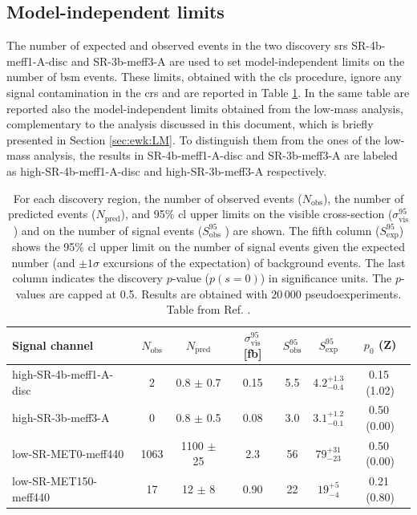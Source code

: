 \subsection{Model-independent limits}
\label{sec:ewk:modelindepUL}

The number of expected and observed events in the two discovery \glspl{sr} SR-4b-meff1-A-disc and SR-3b-meff3-A are used to set model-independent limits on the number of \gls{bsm} events. 
These limits, obtained with the \gls{cls} procedure, ignore any signal contamination in the \glspl{cr} and are reported in Table \ref{tab:ewk:UL_toys}.
In the same table are reported also the model-independent limits obtained from the low-mass analysis, complementary to the analysis 
discussed in this document, which is briefly presented in Section \ref{sec:ewk:LM}. 
To distinguish them from the ones of the low-mass analysis, the results in SR-4b-meff1-A-disc and SR-3b-meff3-A are labeled as 
high-SR-4b-meff1-A-disc and high-SR-3b-meff3-A respectively. 

\begin{table}[htbp]
\begin{center}
\begin{tabular}{|l|c|c|c|c|c|c|}
\toprule
{ Signal channel}           &   $N_\mathrm{obs}$ & $N_\mathrm{pred}$       & $\sigma^\mathrm{95}_\mathrm{vis}$ [fb] &  $S_\mathrm{obs}^\mathrm{95}$  & $S_\mathrm{exp}^\mathrm{95}$ & $p_0$ (Z)  \\
\midrule
high-SR-4b-meff1-A-disc   &    2 &     0.8 $\pm$ 0.7  & 0.15 &   5.5 & ${ 4.2 }^{ +1.3 }_{ -0.4 }$  &  0.15$~$(1.02) \\%
high-SR-3b-meff3-A        &    0 &     0.8 $\pm$ 0.5  & 0.08 &   3.0 & ${ 3.1 }^{ +1.2 }_{ -0.1 }$  &  0.50$~$(0.00) \\%
low-SR-MET0-meff440       & 1063 &    1100 $\pm$ 25   & 2.3  &  56   & ${ 79 }^{ +31 }_{ -23 }$     &  0.50$~$(0.00) \\%
low-SR-MET150-meff440     &   17 &      12 $\pm$ 8    & 0.90 &  22   & ${ 19 }^{ +5 }_{ -4 }$       &  0.21$~$(0.80) \\%
\bottomrule
\end{tabular}
\end{center}
\caption[Model independent upper limits]{For each discovery region, the number of observed events ($N_\mathrm{obs}$), the number of predicted events ($N_\mathrm{pred}$), and 95\% \gls{cl} upper limits on the visible cross-section ($\sigma^\mathrm{95}_\mathrm{vis}$) and on the number of signal events ($S_\mathrm{obs}^\mathrm{95}$ ) are shown.  The fifth column ($S_\mathrm{exp}^\mathrm{95}$) shows the 95\% \gls{cl} upper limit on the number of signal events given the expected number (and $\pm 1\sigma$ excursions of the expectation) of background events. The last column indicates the discovery $p$-value ($p(s=0)$) in significance units. The $p$-values are capped at 0.5. Results are obtained with $20\,000$ pseudoexperiments.
Table from Ref. \cite{Aaboud:2018htj}.
}
\label{tab:ewk:UL_toys}
\end{table}

